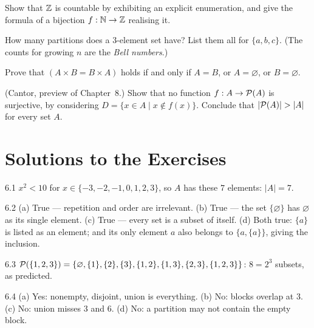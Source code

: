 \begin{exercise}{\medium}
Show that $\mathbb{Z}$ is countable by exhibiting an explicit enumeration, and give
the formula of a bijection $f : \mathbb{N} \to \mathbb{Z}$ realising it.
\end{exercise}

\begin{exercise}{\hard}
How many partitions does a $3$-element set have? List them all for
$\{a,b,c\}$. (The counts for growing $n$ are the \emph{Bell numbers}.)
\end{exercise}

\begin{exercise}{\hard}
Prove that $(A \times B = B \times A)$ holds if and only if
$A = B$, or $A = \varnothing$, or $B = \varnothing$.
\end{exercise}

\begin{exercise}{\hard}
(Cantor, preview of Chapter~8.) Show that no function
$f : A \to \mathcal{P}(A)$ is surjective, by considering
$D = \{x \in A \mid x \notin f(x)\}$. Conclude that
$|\mathcal{P}(A)| > |A|$ for every set $A$.
\end{exercise}

\section*{Solutions to the Exercises}

\begin{solution}{6.1}
$x^2 < 10$ for $x \in \{-3,-2,-1,0,1,2,3\}$, so $A$ has these $7$ elements:
$|A| = 7$.
\end{solution}

\begin{solution}{6.2}
(a) True --- repetition and order are irrelevant. (b) True --- the set
$\{\varnothing\}$ has $\varnothing$ as its single element. (c) True ---
every set is a subset of itself. (d) Both true: $\{a\}$ is listed as an
element; and its only element $a$ also belongs to $\{a,\{a\}\}$, giving the
inclusion.
\end{solution}

\begin{solution}{6.3}
$\mathcal{P}(\{1,2,3\}) = \{\varnothing, \{1\},\{2\},\{3\},
\{1,2\},\{1,3\},\{2,3\},\{1,2,3\}\}$: $8 = 2^3$ subsets, as predicted.
\end{solution}

\begin{solution}{6.4}
(a) Yes: nonempty, disjoint, union is everything. (b) No: blocks overlap at
$3$. (c) No: union misses $3$ and $6$. (d) No: a partition may not contain
the empty block.
\end{solution}

